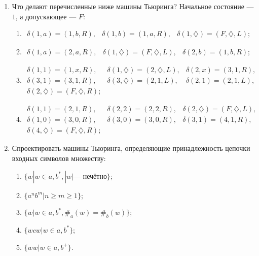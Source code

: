 \begin{enumerate}
    \item Что делают перечисленные ниже машины Тьюринга? Начальное состояние --- $1$, а допускающее --- $F$:
    \begin{enumerate}
        \item 
            \(
                \begin{array}{lll}
                    \delta(1,a)=(1,b,R),&\delta(1,b)=(1,a,R),&\delta(1,\diamondsuit)=(F,\diamondsuit,L);
                \end{array}
            \)
        \item 
            \(
                \begin{array}{lll}
                    \delta(1,a)=(2,a,R),&\delta(1,\diamondsuit)=(F,\diamondsuit,L),&\delta(2,b)=(1,b,R);
                \end{array}
            \)
        \item 
            \(
                \begin{array}{lll}
                    \delta(1,1)=(1,x,R),
                        &\delta(1,\diamondsuit)=(2,\diamondsuit,L),
                            &\delta(2,x)=(3,1,R),\\
                    \delta(3,1)=(3,1,R),
                        &\delta(3,\diamondsuit)=(2,1,L),
                            &\delta(2,1)=(2,1,L),\\
                    \delta(2,\diamondsuit)=(F,\diamondsuit,R);
                        &
                            &
                \end{array}
            \)
        \item 
            \(
                \begin{array}{lll}
                    \delta(1,1)=(2,1,R),
                        &\delta(2,2)=(2,2,R),
                            &\delta(2,\diamondsuit)=(F,\diamondsuit,L),\\
                    \delta(1,0)=(3,0,R),
                        &\delta(3,0)=(3,0,R),
                            &\delta(3,1)=(4,1,R),\\
                    \delta(4,\diamondsuit)=(F,\diamondsuit,R);
                        &
                            &
                \end{array}
            \)
    \end{enumerate}
    
    \item Спроектировать машины Тьюринга, определяющие принадлежность цепочки входных символов множеству:
    \begin{enumerate}
        \item $\{w|w\in{a,b}^*, |w| \text{--- нечётно}\}$; 
        \item $\{a^nb^m|n\geq m\geq 1\}$;
        \item $\{w|w\in{a,b}^*, \#_a(w)=\#_b(w)\}$;
        \item $\{wcw|w\in{a,b}^*\}$;
        \item $\{ww|w\in{a,b}^+\}$.
    \end{enumerate}
    

\end{enumerate}
